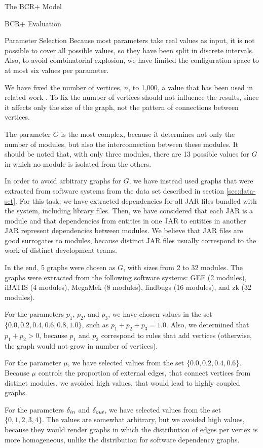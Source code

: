 \documentclass[11pt,twocolumn,a4paper,english]{article}
\begin{document}
\begin{section}{The BCR+ Model}
\begin{subsection}{BCR+ Evaluation}
\begin{subsubsection}{Parameter Selection}
	Because most parameters take real values as input, it is not possible to cover all possible values, so they have been split in discrete intervals. Also, to avoid combinatorial explosion, we have limited the configuration space to at most six values per parameter.
	
	We have fixed the number of vertices, $n$, to 1,000, a value that has been used in related work \cite{Lancichinetti2009b}. To fix the number of vertices should not influence the results, since it affects only the size of the graph, not the pattern of connections between vertices.
	
	The parameter $G$ is the most complex, because it determines not only the number of modules, but also the interconnection between these modules. It should be noted that, with only three modules, there are 13 possible values for $G$ in which no module is isolated from the others.
	
	In order to avoid arbitrary graphs for $G$, we have instead used graphs that were extracted from software systems from the data set described in section \ref{sec:data-set}. For this task, we have extracted dependencies for all JAR files bundled with the system, including library files. Then, we have considered that each JAR is a module and that dependencies from entities in one JAR to entities in another JAR represent dependencies between modules. We believe that JAR files are good surrogates to modules, because distinct JAR files usually correspond to the work of distinct development teams.
	
	In the end, 5 graphs were chosen as $G$, with sizes from 2 to 32 modules. The graphs were extracted from the following software systems: GEF (2 modules), iBATIS (4 modules), MegaMek (8 modules), findbugs (16 modules), and zk (32 modules).
	
	For the parameters $p_1$, $p_2$, and $p_3$, we have chosen values in the set $\{0.0, 0.2, 0.4, 0.6, 0.8, 1.0\}$, such as $p_1 + p_2 + p_3 = 1.0$. Also, we determined that $p_1 + p_2 > 0$, because $p_1$ and $p_2$ correspond to rules that add vertices (otherwise, the graph would not grow in number of vertices).
	
	For the parameter $\mu$, we have selected values from the set $\{0.0, 0.2, 0.4, 0.6\}$. Because $\mu$ controls the proportion of external edges, that connect vertices from distinct modules, we avoided high values, that would lead to highly coupled graphs.
	
	For the parameters $\delta_{in}$ and $\delta_{out}$, we have selected values from the set $\{0, 1, 2, 3, 4\}$. The values are somewhat arbitrary, but we avoided high values, because they would render graphs in which the distribution of edges per vertex is more homogeneous, unlike the distribution for software dependency graphs.
	

\end{subsubsection}
\end{subsection}
\end{section}
\end{document}
